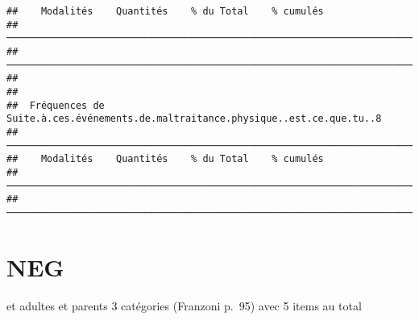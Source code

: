 \documentclass[
]{article}
\newenvironment{Shaded}{\begin{snugshade}}{\end{snugshade}}
\newcommand{\DecValTok}[1]{\textcolor[rgb]{0.00,0.00,0.81}{#1}}
\newcommand{\FunctionTok}[1]{\textcolor[rgb]{0.00,0.00,0.00}{#1}}
\newcommand{\NormalTok}[1]{#1}
\newcommand{\OtherTok}[1]{\textcolor[rgb]{0.56,0.35,0.01}{#1}}
\newcommand{\SpecialCharTok}[1]{\textcolor[rgb]{0.00,0.00,0.00}{#1}}
\newcommand{\StringTok}[1]{\textcolor[rgb]{0.31,0.60,0.02}{#1}}
\begin{document}
\begin{verbatim}
##    Modalités    Quantités    % du Total    % cumulés   
##  ─────────────────────────────────────────────────────────────────────────────── 
##  ─────────────────────────────────────────────────────────────────────────────── 
## 
## 
##  Fréquences de Suite.à.ces.événements.de.maltraitance.physique..est.ce.que.tu..8 
##  ─────────────────────────────────────────────────────────────────────────────── 
##    Modalités    Quantités    % du Total    % cumulés   
##  ─────────────────────────────────────────────────────────────────────────────── 
##  ───────────────────────────────────────────────────────────────────────────────
\end{verbatim}

\hypertarget{neg}{%
\section{NEG}\label{neg}}

et adultes et parents 3 catégories (Franzoni p.~95) avec 5 items au
total

\begin{Shaded}
\end{Shaded}
\end{document}
